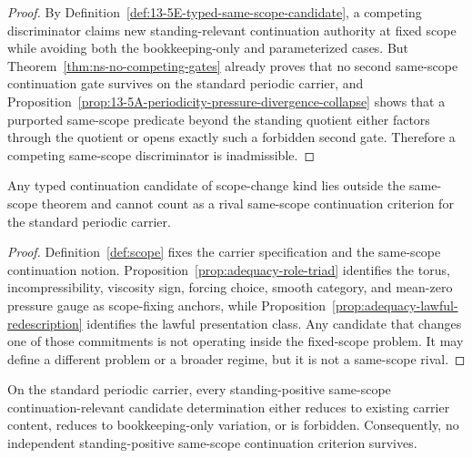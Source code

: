 \begin{proof}
By Definition~\ref{def:13-5E-typed-same-scope-candidate}, a competing discriminator claims new
standing-relevant continuation authority at fixed scope while avoiding both the bookkeeping-only and
parameterized cases. But Theorem~\ref{thm:ns-no-competing-gates} already proves that no second
same-scope continuation gate survives on the standard periodic carrier, and
Proposition~\ref{prop:13-5A-periodicity-pressure-divergence-collapse} shows that a purported same-scope
predicate beyond the standing quotient either factors through the quotient or opens exactly such a
forbidden second gate. Therefore a competing same-scope discriminator is inadmissible.
\end{proof}

\begin{manualproposition}
\label{prop:13-5K-scope-change-not-rival}
Any typed continuation candidate of scope-change kind lies outside the same-scope theorem and cannot
count as a rival same-scope continuation criterion for the standard periodic carrier.
\end{manualproposition}

\begin{proof}
Definition~\ref{def:scope} fixes the carrier specification and the same-scope continuation notion.
Proposition~\ref{prop:adequacy-role-triad} identifies the torus, incompressibility, viscosity sign,
forcing choice, smooth category, and mean-zero pressure gauge as scope-fixing anchors, while
Proposition~\ref{prop:adequacy-lawful-redescription} identifies the lawful presentation class. Any
candidate that changes one of those commitments is not operating inside the fixed-scope problem.
It may define a different problem or a broader regime, but it is not a same-scope rival.
\end{proof}

\begin{manualcorollary}
\label{cor:13-5L-rival-elimination}
On the standard periodic carrier, every standing-positive same-scope continuation-relevant candidate determination either reduces to
existing carrier content, reduces to bookkeeping-only variation, or is forbidden. Consequently, no
independent standing-positive same-scope continuation criterion survives.
\end{manualcorollary}

